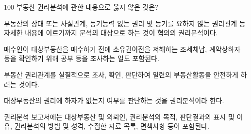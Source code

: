 \begin{question}{100}
부동산 권리분석에 관한 내용으로 옳지 않은 것은?
\begin{choices}
  \item 부동산의 상태 또는 사실관계, 등기능력 없는 권리 및 등기를 요하지 않는 권리관계 등 자세한 내용에 이르기까지 분석의 대상으로 하는 것이 협의의 권리분석이다.
  \item 매수인이 대상부동산을 매수하기 전에 소유권이전을 저해하는 조세체납, 계약상하자 등을 확인하기 위해 공부 등을 조사하는 일도 포함된다.
  \item 부동산 권리관계를 실질적으로 조사, 확인, 판단하여 일련의 부동산활동을 안전하게 하려는 것이다.
  \item 대상부동산의 권리에 하자가 없는지 여부를 판단하는 것을 권리분석이라 한다.
  \item 권리분석 보고서에는 대상부동산 및 의뢰인, 권리분석의 목적, 판단결과의 표시 및 이유, 권리분석의 방법 및 성격, 수집한 자료 목록, 면책사항 등이 포함된다.
\end{choices}
\end{question}
